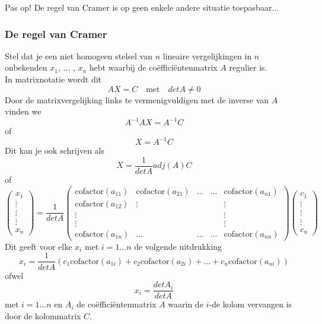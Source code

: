 Pas op! De regel van Cramer is op geen enkele andere situatie toepasbaar...

\subsubsection{De regel van Cramer}

Stel dat je een niet homogeen stelsel van $n$ lineaire vergelijkingen in $n$ onbekenden $x_1$, $...$ , $x_n$ hebt waarbij de co\"{e}ffici\"{e}ntenmatrix $A$ regulier is.\\
In matrixnotatie wordt dit 
\[ AX=C \quad \textrm{met} \quad det A \neq 0  \]
Door de matrixvergelijking links te vermenigvuldigen met de inverse van $A$ vinden we
\[ A^{-1}AX=A^{-1}C \]
of
\[ X=A^{-1}C \]
Dit kan je ook schrijven als
\[ X=\frac{1}{det A}adj(A) C \]
of
\[
\left( \begin{matrix} x_1 \\ \vdots \\ \vdots \\ \vdots \\ x_n \end{matrix} \right) = \frac{1}{det A} \left( \begin{matrix} \text{cofactor}(a_{11}) & \text{cofactor}(a_{21}) & \ldots & \ldots & \text{cofactor}(a_{n1}) \\ \text{cofactor}(a_{12}) & \vdots & & & \vdots \\ \vdots & & & & \vdots \\ \vdots & & & & \vdots \\ \text{cofactor}(a_{1n}) & \ldots & \ldots & \ldots & \text{cofactor}(a_{nn}) \end{matrix} \right) \left( \begin{matrix} c_1 \\ \vdots \\ \vdots \\ \vdots \\ c_n \end{matrix} \right)
\]
Dit geeft voor elke $x_i$ met $i=1...n$ de volgende uitdrukking
\[
x_i = \frac{1}{det A} (c_1 \text{cofactor}(a_{1i}) + c_2 \text{cofactor}(a_{2i}) + ... + c_n \text{cofactor}(a_{ni})) 
\]
ofwel
\[
x_i = \frac{det A_{i}}{det A}
\]
met $i=1...n$ en $A_{i}$ de co\"{e}ffici\"{e}ntenmatrix $A$ waarin de $i$-de kolom vervangen is door de kolommatrix $C$. \\

